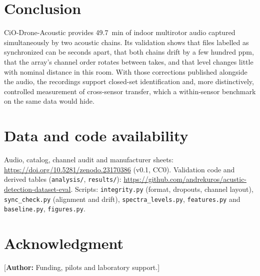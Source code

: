 \documentclass[journal]{IEEEtran}
\newif\ifshowauthornotes\showauthornotestrue
\newcommand{\authornote}[1]{\ifshowauthornotes{\color{red!70!black}[\textbf{Author:} #1]}\fi}
\begin{document}
\section{Conclusion}
CiO-Drone-Acoustic provides \SI{49.7}{\minute} of indoor multirotor audio captured simultaneously by two acoustic chains.
Its validation shows that files labelled as synchronized can be seconds apart, that both chains drift by a few hundred ppm, that the array's channel order rotates between takes, and that level changes little with nominal distance in this room.
With those corrections published alongside the audio, the recordings support closed-set identification and, more distinctively, controlled measurement of cross-sensor transfer, which a within-sensor benchmark on the same data would hide.

\section{Data and code availability}\label{sec:code}
Audio, catalog, channel audit and manufacturer sheets: \url{https://doi.org/10.5281/zenodo.23170386} (v0.1, CC0).
Validation code and derived tables (\texttt{analysis/}, \texttt{results/}): \url{https://github.com/andrekuros/acustic-detection-dataset-eval}.
Scripts: \texttt{integrity.py} (format, dropouts, channel layout), \texttt{sync\_check.py} (alignment and drift), \texttt{spectra\_levels.py}, \texttt{features.py} and \texttt{baseline.py}, \texttt{figures.py}.

\section*{Acknowledgment}
\authornote{Funding, pilots and laboratory support.}



\end{document}
